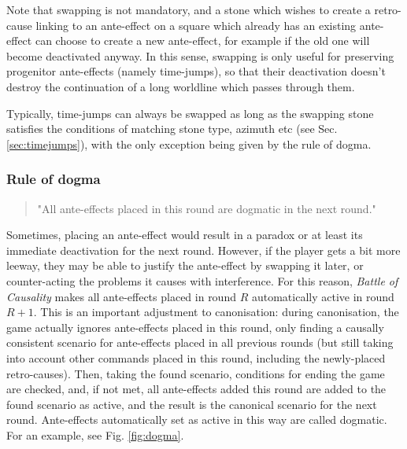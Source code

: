 \documentclass[12pt]{article}
\begin{document}
Note that swapping is not mandatory, and a stone which wishes to create a retro-cause linking to an ante-effect on a square which already has an existing ante-effect can choose to create a new ante-effect, for example if the old one will become deactivated anyway. In this sense, swapping is only useful for preserving progenitor ante-effects (namely time-jumps), so that their deactivation doesn't destroy the continuation of a long worldline which passes through them.

	Typically, time-jumps can always be swapped as long as the swapping stone satisfies the conditions of matching stone type, azimuth etc (see Sec. \ref{sec:timejumps}), with the only exception being given by the rule of dogma.
	
	\subsubsection{Rule of dogma}\label{sec:rule of dogma}
	\begin{quote}
	"All ante-effects placed in this round are dogmatic in the next round."
	\end{quote}
	
	Sometimes, placing an ante-effect would result in a paradox or at least its immediate deactivation for the next round. However, if the player gets a bit more leeway, they may be able to justify the ante-effect by swapping it later, or counter-acting the problems it causes with interference. For this reason, \textit{Battle of Causality} makes all ante-effects placed in round $R$ automatically active in round $R+1$. This is an important adjustment to canonisation: during canonisation, the game actually ignores ante-effects placed in this round, only finding a causally consistent scenario for ante-effects placed in all previous rounds (but still taking into account other commands placed in this round, including the newly-placed retro-causes). Then, taking the found scenario, conditions for ending the game are checked, and, if not met, all ante-effects added this round are added to the found scenario as active, and the result is the canonical scenario for the next round. Ante-effects automatically set as active in this way are called dogmatic. For an example, see Fig. \ref{fig:dogma}.
	
\end{document}
